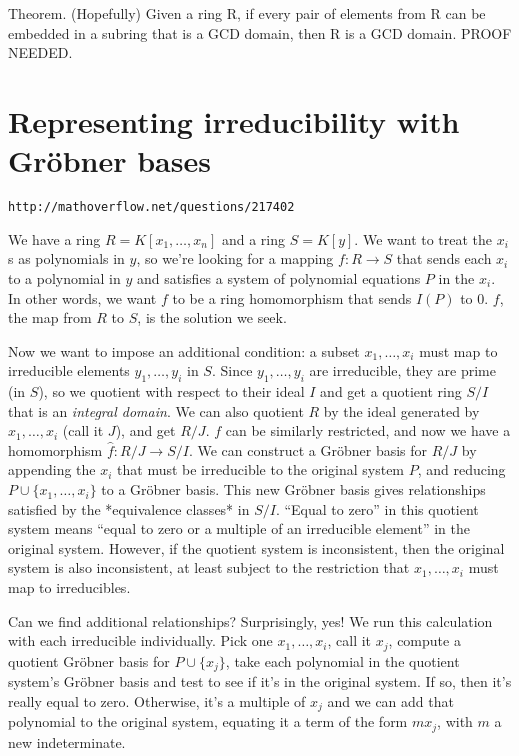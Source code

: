 \documentclass{article}
\begin{document}
Theorem.  (Hopefully) Given a ring R, if every pair of elements from R can be
embedded in a subring that is a GCD domain, then R is a GCD domain.
PROOF NEEDED.

\vfill\eject
\section*{Representing irreducibility with Gr\"obner bases}

\centerline{\tt http://mathoverflow.net/questions/217402}

We have a ring $R=K[x_1,\ldots,x_n]$ and a ring $S=K[y]$.  We want to
treat the $x_i$s as polynomials in $y$, so we're looking for a mapping
$f:R\to S$ that sends each $x_i$ to a polynomial in $y$ and satisfies
a system of polynomial equations $P$ in the $x_i$.  In other words, we
want $f$ to be a ring homomorphism that sends $I(P)$ to 0.  $f$, the
map from $R$ to $S$, is the solution we seek.

Now we want to impose an additional condition: a subset
$x_1,\ldots,x_i$ must map to irreducible elements $y_1,\ldots,y_i$ in
$S$.  Since $y_1,\ldots,y_i$ are irreducible, they are prime (in $S$),
so we quotient with respect to their ideal $I$ and get a quotient ring
$S/I$ that is an {\it integral domain}.  We can also quotient $R$ by the
ideal generated by $x_1,\ldots,x_i$ (call it $J$), and get $R/J$.  $f$
can be similarly restricted, and now we have a homomorphism $\hat{f}:
R/J \to S/I$.  We can construct a Gr\"obner basis for $R/J$ by appending
the $x_i$ that must be irreducible to the original system $P$, and
reducing $P \cup \{x_1,\ldots,x_i\}$ to a Gr\"obner basis.  This new
Gr\"obner basis gives relationships satisfied by the *equivalence
classes* in $S/I$.  ``Equal to zero'' in this quotient system means
``equal to zero or a multiple of an irreducible element'' in the
original system. However, if the quotient system is inconsistent, then
the original system is also inconsistent, at least subject to the
restriction that $x_1,\ldots,x_i$ must map to irreducibles.

Can we find additional relationships?  Surprisingly, yes!  We run this
calculation with each irreducible individually.  Pick one
$x_1,\ldots,x_i$, call it $x_j$, compute a quotient Gr\"obner basis for
$P \cup \{x_j\}$, take each polynomial in the quotient system's
Gr\"obner basis and test to see if it's in the original system.  If so,
then it's really equal to zero.  Otherwise, it's a multiple of $x_j$
and we can add that polynomial to the original system, equating it a
term of the form $m x_j$, with $m$ a new indeterminate.
\end{document}
